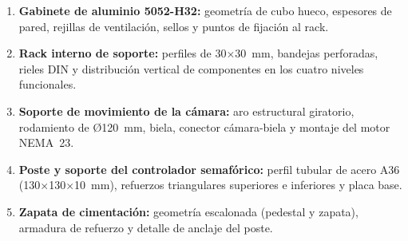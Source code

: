 \begin{enumerate}
  \item \textbf{Gabinete de aluminio 5052-H32:} geometría de cubo hueco, espesores de pared, rejillas de ventilación, sellos y puntos de fijación al rack.
  \item \textbf{Rack interno de soporte:} perfiles de 30$\times$30~mm, bandejas perforadas, rieles DIN y distribución vertical de componentes en los cuatro niveles funcionales.
  \item \textbf{Soporte de movimiento de la cámara:} aro estructural giratorio, rodamiento de Ø120~mm, biela, conector cámara-biela y montaje del motor NEMA~23.
  \item \textbf{Poste y soporte del controlador semafórico:} perfil tubular de acero A36 (130$\times$130$\times$10~mm), refuerzos triangulares superiores e inferiores y placa base.
  \item \textbf{Zapata de cimentación:} geometría escalonada (pedestal y zapata), armadura de refuerzo y detalle de anclaje del poste.
\end{enumerate}

